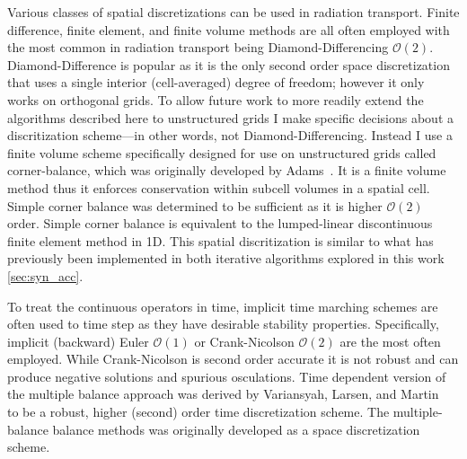 Various classes of spatial discretizations can be used in radiation transport.
Finite difference, finite element, and finite volume methods are all often employed with the most common in radiation transport being Diamond-Differencing $\mathcal{O}(2)$.
Diamond-Difference is popular as it is the only second order space discretization that uses a single interior (cell-averaged) degree of freedom; however it only works on orthogonal grids.
To allow future work to more readily extend the algorithms described here to unstructured grids I make specific decisions about a discritization scheme---in other words, not Diamond-Differencing.
Instead I use a finite volume scheme specifically designed for use on unstructured grids called corner-balance, which was originally developed by Adams~\cite{adams_subcell_1997}.
It is a finite volume method thus it enforces conservation within subcell volumes in a spatial cell.
Simple corner balance was determined to be sufficient as it is higher $\mathcal{O}(2)$ order.
Simple corner balance is equivalent to the lumped-linear discontinuous finite element method in 1D.
This spatial discritization is similar to what has previously been implemented in both iterative algorithms explored in this work \ref{sec:syn_acc}.

To treat the continuous operators in time, implicit time marching schemes are often used to time step as they have desirable stability properties.
Specifically, implicit (backward) Euler $\mathcal{O}(1)$ or Crank-Nicolson $\mathcal{O}(2)$ are the most often employed.
While Crank-Nicolson is second order accurate it is not robust and can produce negative solutions and spurious osculations.
Time dependent version of the multiple balance approach was derived by Variansyah, Larsen, and Martin~\cite{variansyah_robust_2021, ilham_phd} to be a robust, higher (second) order time discretization scheme.
The multiple-balance balance methods was originally developed as a space discretization scheme.

